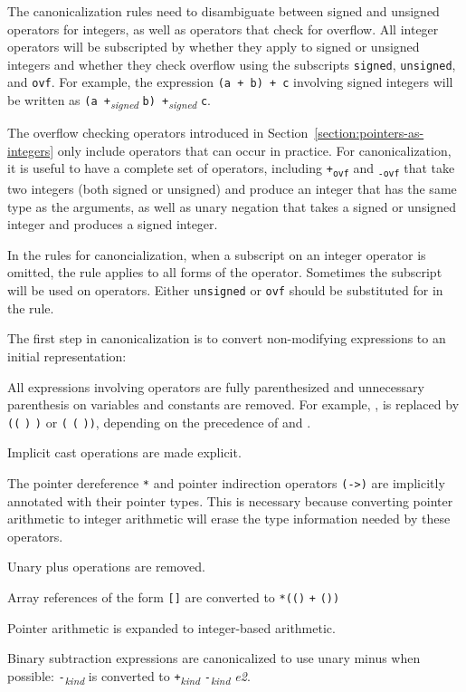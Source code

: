 The canonicalization rules need to disambiguate between signed and
unsigned operators for integers, as well as operators that check for
overflow. All integer operators will be subscripted by whether they
apply to signed or unsigned integers and whether they check overflow 
using the subscripts \texttt{signed}, \texttt{unsigned}, and
\texttt{ovf}. For example, the expression \texttt{(a + b) + c} involving
signed integers will be written as \texttt{(a
+}\emph{\textsubscript{signed}} \texttt{b)
+}\emph{\textsubscript{signed}} \texttt{c}.

The overflow checking operators introduced in
Section~\ref{section:pointers-as-integers} only include
operators that can occur in practice. For canonicalization, it is useful
to have a complete set of operators, including
\texttt{+\textsubscript{ovf}} and \texttt{\textsubscript{-ovf}} that
take two integers (both signed or unsigned) and produce an integer that
has the same type as the arguments, as well as unary negation that takes
a signed or unsigned integer and produces a signed integer.

In the rules for canoncialization, when a subscript on an integer
operator is omitted, the rule applies to all forms of the operator.
Sometimes the subscript  will be used on operators. Either
u\texttt{nsigned} or \texttt{ovf} should be substituted for 
in the rule.

The first step in canonicalization is to convert non-modifying
expressions to an initial representation:

\begin{compactenum}
\item
  All expressions involving operators are fully parenthesized and
  unnecessary parenthesis on variables and constants are removed. For
  example,     , is
  replaced by \texttt{((}  \texttt{)}
   \texttt{)} or \texttt{(} 
  \texttt{(}  \texttt{))}, depending on the
  precedence of  and .
\item
  Implicit cast operations are made explicit.
\item
  The pointer dereference \texttt{*} and pointer indirection operators
  \texttt{(->)} are implicitly annotated with their pointer types.
  This is necessary because converting pointer arithmetic to integer
  arithmetic will erase the type information needed by these operators.
\item
  Unary plus operations are removed.
\item
  Array references of the form
  \texttt{[}\texttt{]} are converted to
  \texttt{*((}\texttt{)} \texttt{+}
  \texttt{(}\texttt{))}
\item
  Pointer arithmetic is expanded to integer-based arithmetic.
\item
  Binary subtraction expressions are canonicalized to use unary minus
  when possible:  \texttt{-}\emph{\textsubscript{kind}}
   is converted to 
  \texttt{+}\emph{\textsubscript{kind}}
  \texttt{-}\emph{\textsubscript{kind} e2}.
\end{compactenum}

